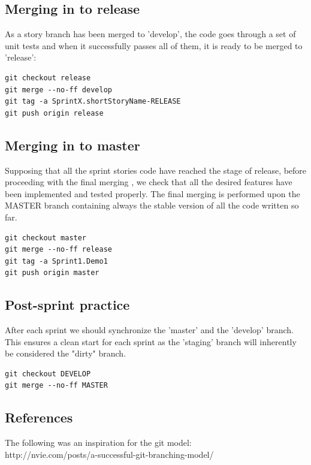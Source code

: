 \subsection{Merging in to release}
As a story branch has been merged to 'develop', the code goes through a set of unit tests and when it successfully passes all of them, it is ready to be merged to 'release': 
\begin{verbatim}
git checkout release
git merge --no-ff develop
git tag -a SprintX.shortStoryName-RELEASE
git push origin release
\end{verbatim}
\subsection{Merging in to master}
Supposing that all the sprint stories code have reached the stage of release, before proceeding with the final merging , we check that all the desired features have been implemented and tested properly.
The final merging is performed upon the MASTER branch containing always the stable version of all the code written so far.
  \begin{verbatim}
git checkout master
git merge --no-ff release
git tag -a Sprint1.Demo1
git push origin master
\end{verbatim}
\subsection{Post-sprint practice}

After each sprint we should synchronize the 'master' and the 'develop' branch. This ensures a clean start for each sprint as the 'staging' branch will inherently be considered the "dirty" branch. 

  \begin{verbatim}
git checkout DEVELOP
git merge --no-ff MASTER
\end{verbatim}

\subsection{References}
The following was an inspiration for the git model:\\

http://nvie.com/posts/a-successful-git-branching-model/
 \\
